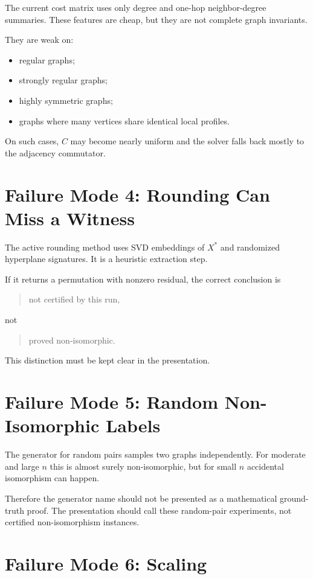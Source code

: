 \documentclass[11pt]{article}
\begin{document}
The current cost matrix uses only degree and one-hop neighbor-degree summaries.
These features are cheap, but they are not complete graph invariants.

They are weak on:
\begin{itemize}[leftmargin=*]
    \item regular graphs;
    \item strongly regular graphs;
    \item highly symmetric graphs;
    \item graphs where many vertices share identical local profiles.
\end{itemize}

On such cases, $C$ may become nearly uniform and the solver falls back mostly
to the adjacency commutator.

\section{Failure Mode 4: Rounding Can Miss a Witness}

The active rounding method uses SVD embeddings of $X^*$ and randomized
hyperplane signatures.
It is a heuristic extraction step.

If it returns a permutation with nonzero residual, the correct conclusion is
\begin{quote}
not certified by this run,
\end{quote}
not
\begin{quote}
proved non-isomorphic.
\end{quote}

This distinction must be kept clear in the presentation.

\section{Failure Mode 5: Random Non-Isomorphic Labels}

The generator for random pairs samples two graphs independently.
For moderate and large $n$ this is almost surely non-isomorphic, but for small
$n$ accidental isomorphism can happen.

Therefore the generator name should not be presented as a mathematical
ground-truth proof.
The presentation should call these random-pair experiments, not certified
non-isomorphism instances.

\section{Failure Mode 6: Scaling}
\end{document}

